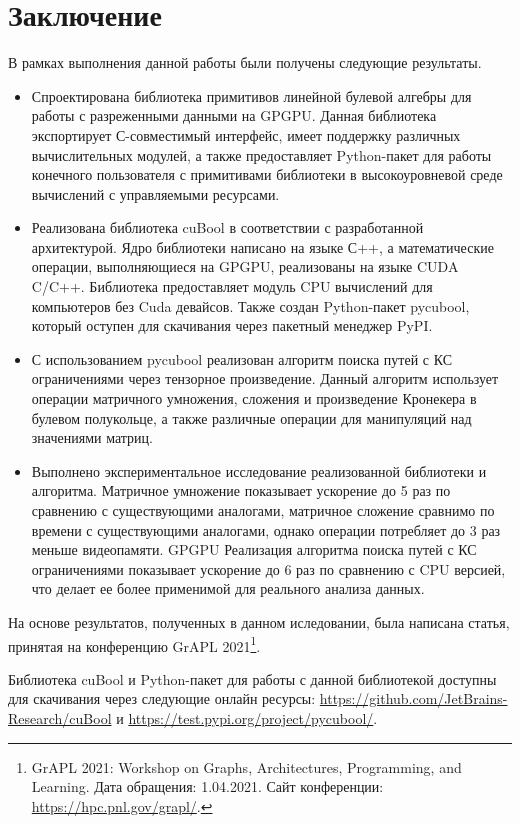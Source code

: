\section{Заключение}

В рамках выполнения данной работы были получены следующие результаты.

\begin{itemize}
    \item Спроектирована библиотека примитивов линейной булевой алгебры для работы с разреженными данными на GPGPU. 
    Данная библиотека экспортирует С-совместимый интерфейс, имеет поддержку различных вычислительных модулей, а также предоставляет Python-пакет для работы конечного пользователя с примитивами библиотеки в высокоуровневой среде вычислений с управляемыми ресурсами.

    \item Реализована библиотека cuBool в соответствии с разработанной архитектурой. 
    Ядро библиотеки написано на языке С++, а математические операции, выполняющиеся на GPGPU, реализованы на языке CUDA C/C++. Библиотека предоставляет модуль CPU вычислений для компьютеров без Cuda девайсов. 
    Также создан Python-пакет pycubool, который оступен для скачивания через пакетный менеджер PyPI.
    
    \item С использованием pycubool реализован алгоритм поиска путей с КС ограничениями через тензорное произведение. 
    Данный алгоритм использует операции матричного умножения, сложения и произведение Кронекера в булевом полукольце, а также различные операции для манипуляций над значениями матриц. 
   
    
    \item Выполнено экспериментальное исследование реализованной библиотеки и алгоритма.
    Матричное умножение показывает ускорение до 5 раз по сравнению с существующими аналогами, 
    матричное сложение сравнимо по времени с существующими аналогами, 
    однако операции потребляет до 3 раз меньше видеопамяти. 
    GPGPU Реализация алгоритма поиска путей с КС ограничениями показывает ускорение до 6 раз по сравнению с CPU версией, что делает ее более применимой для реального анализа данных.
\end{itemize}

На основе результатов, полученных в данном иследовании, была написана статья, принятая на конференцию GrAPL 2021\footnote{GrAPL 2021: Workshop on Graphs, Architectures, Programming, and Learning. Дата обращения: 1.04.2021. Сайт конференции: \url{https://hpc.pnl.gov/grapl/}.}.

Библиотека cuBool и Python-пакет для работы с данной библиотекой доступны для скачивания через следующие онлайн ресурсы: \url{https://github.com/JetBrains-Research/cuBool} и \url{https://test.pypi.org/project/pycubool/}.